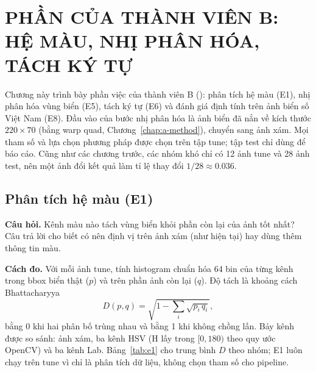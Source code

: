 \chapter{PHẦN CỦA THÀNH VIÊN B: HỆ MÀU, NHỊ PHÂN HÓA, TÁCH KÝ TỰ}
\label{chap:b}

Chương này trình bày phần việc của thành viên B (\TenB): phân tích hệ màu (E1), nhị phân hóa vùng biển (E5), tách ký tự (E6) và đánh giá định tính trên ảnh biển số Việt Nam (E8). Đầu vào của bước nhị phân hóa là ảnh biển đã nắn về kích thước $220\times 70$ (bằng warp quad, Chương~\ref{chap:a-method}), chuyển sang ảnh xám. Mọi tham số và lựa chọn phương pháp được chọn trên tập tune; tập test chỉ dùng để báo cáo. Cũng như các chương trước, các nhóm khó chỉ có 12 ảnh tune và 28 ảnh test, nên một ảnh đổi kết quả làm tỉ lệ thay đổi $1/28\approx 0.036$.

\section{Phân tích hệ màu (E1)}
\label{sec:b-color}

\textbf{Câu hỏi.} Kênh màu nào tách vùng biển khỏi phần còn lại của ảnh tốt nhất? Câu trả lời cho biết có nên định vị trên ảnh xám (như  hiện tại) hay dùng thêm thông tin màu.

\textbf{Cách đo.} Với mỗi ảnh tune, tính histogram chuẩn hóa 64 bin của từng kênh trong bbox biển thật ($p$) và trên phần ảnh còn lại ($q$). Độ tách là khoảng cách Bhattacharyya
\[
D(p,q)=\sqrt{1-\sum_{i}\sqrt{p_i\,q_i}},
\]
bằng 0 khi hai phân bố trùng nhau và bằng 1 khi không chồng lấn. Bảy kênh được so sánh: ảnh xám, ba kênh HSV (H lấy trong $[0,180)$ theo quy ước OpenCV) và ba kênh Lab. Bảng~\ref{tab:e1} cho trung bình $D$ theo nhóm; E1 luôn chạy trên tune vì chỉ là phân tích dữ liệu, không chọn tham số cho pipeline.


